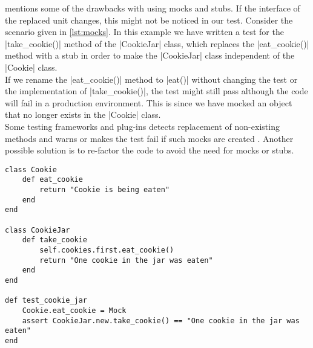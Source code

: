 \citet{video:boundaries} mentions some of the drawbacks with using mocks
and stubs. If the interface of the replaced unit changes, this might not
be noticed in our test. Consider the scenario given in \ref{lst:mocks}.
In this example we have written a test for the |take_cookie()| method of
the |CookieJar| class, which replaces the |eat_cookie()| method with a
stub in order to make the |CookieJar| class independent of the |Cookie|
class.\\

If we rename the |eat_cookie()| method to |eat()| without changing the
test or the implementation of |take_cookie()|, the test might still pass
although the code will fail in a production environment. This is since
we have mocked an object that no longer exists in the |Cookie| class.\\

Some testing frameworks and plug-ins detects replacement of non-existing
methods and warns or makes the test fail if such mocks are created
\cite{video:boundaries}. Another possible solution is to re-factor the
code to avoid the need for mocks or stubs.\\

\begin{lstlisting}[caption=Example of how mocking might make tests unaware
                           of changes which breaks functionality.,
                   label=lst:mocks, float=t]
class Cookie
    def eat_cookie
        return "Cookie is being eaten"
    end
end

class CookieJar
    def take_cookie
        self.cookies.first.eat_cookie()
        return "One cookie in the jar was eaten"
    end
end

def test_cookie_jar
    Cookie.eat_cookie = Mock
    assert CookieJar.new.take_cookie() == "One cookie in the jar was eaten"
end
\end{lstlisting}
